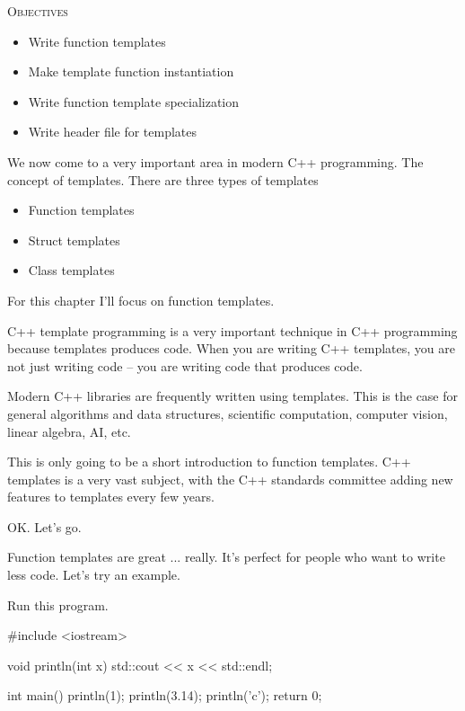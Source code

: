 \newpage{}

\textsc{Objectives}
\begin{itemize}
\item Write function templates
\item Make template function instantiation
\item Write function template specialization
\item Write header file for templates
\end{itemize}

We now come to a very important area in modern C++ programming. The
concept of templates. There are three types of templates

\begin{itemize}
\item Function templates
\item Struct templates
\item Class templates
\end{itemize}

For this chapter I'll focus on function templates.

C++ template programming is a very important technique in C++
programming because templates produces code. When you are writing C++
templates, you are not just writing code -- you are writing code that
produces code.

Modern C++ libraries are frequently written using templates. This is the
case for general algorithms and data structures, scientific computation,
computer vision, linear algebra, AI, etc.

This is only going to be a short introduction to function templates. C++
templates is a very vast subject, with the C++ standards committee
adding new features to templates every few years.

OK. Let's go.


\newpage{}

Function templates are great ... really. It's perfect
for people who want to write less code. Let's try an
example.

Run this program.

\begin{consolethree}[escapeinside=||]
#include <iostream>

void println(int x)
{
    std::cout << x << std::endl;
}

int main()
{
    println(1);
    println(3.14);
    println('c');
    return 0;
}
\end{consolethree}

